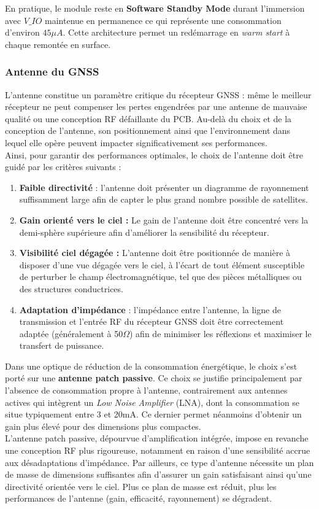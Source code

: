 \documentclass[12pt]{article}
\begin{document}
En pratique, le module reste en \textbf{Software Standby Mode} durant l'immersion avec $V\_IO$ maintenue en permanence ce qui représente une consommation d'environ $45\mu A$. Cette architecture permet un redémarrage en \textit{warm start} à chaque remontée en surface. 

\subsubsection{Antenne du GNSS}
L'antenne constitue un paramètre critique du récepteur GNSS : même le meilleur récepteur ne peut compenser les pertes engendrées par une antenne de mauvaise qualité ou une conception RF défaillante du PCB. Au-delà du choix et de la conception de l'antenne, son positionnement ainsi que l'environnement dans lequel elle opère peuvent impacter significativement ses performances. \\
Ainsi, pour garantir des performances optimales, le choix de l'antenne doit être guidé par les critères suivants :
\begin{enumerate}
\item \textbf{Faible directivité} : l’antenne doit présenter un diagramme de rayonnement suffisamment large afin de capter le plus grand nombre possible de satellites.
\item \textbf{Gain orienté vers le ciel :} Le gain de l'antenne doit être concentré vers la demi-sphère supérieure afin d'améliorer la sensibilité du récepteur. 
\item \textbf{Visibilité ciel dégagée :} L'antenne doit être positionnée de manière à disposer d'une vue dégagée vers le ciel, à l'écart de tout élément susceptible de perturber le champ électromagnétique, tel que des pièces métalliques ou des structures conductrices.
\item \textbf{Adaptation d’impédance} : l’impédance entre l’antenne, la ligne de transmission et l’entrée RF du récepteur GNSS doit être correctement adaptée (généralement à 50$\Omega$) afin de minimiser les réflexions et maximiser le transfert de puissance.
\end{enumerate}

Dans une optique de réduction de la consommation énergétique, le choix s’est porté sur une \textbf{antenne patch passive}. Ce choix se justifie principalement par l’absence de consommation propre à l’antenne, contrairement aux antennes actives qui intègrent un \textit{Low Noise Amplifier} (LNA), dont la consommation se situe typiquement entre 3 et 20mA.  Ce dernier permet néanmoins d'obtenir un gain plus élevé pour des dimensions plus compactes. \\
L’antenne patch passive, dépourvue d’amplification intégrée, impose en revanche une conception RF plus rigoureuse, notamment en raison d’une sensibilité accrue aux désadaptations d’impédance. Par ailleurs, ce type d’antenne nécessite un plan de masse de dimensions suffisantes afin d’assurer un gain satisfaisant ainsi qu’une directivité orientée vers le ciel. Plus ce plan de masse est réduit, plus les performances de l’antenne (gain, efficacité, rayonnement) se dégradent.
\end{document}
